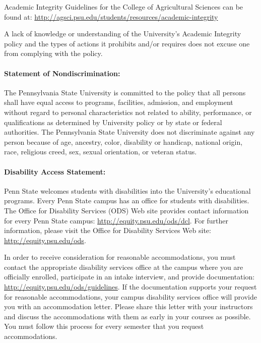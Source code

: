 \documentclass[11pt]{article}
\begin{document}
Academic Integrity Guidelines for the College of Agricultural Sciences can be found at: \url{http://agsci.psu.edu/students/resources/academic-integrity}

A lack of knowledge or understanding of the University's Academic Integrity policy and the types of actions it prohibits and/or requires does not excuse one from complying with the policy.

\paragraph{Statement of Nondiscrimination:} The Pennsylvania State University is committed to the policy that all persons shall have equal access to programs, facilities, admission, and employment without regard to personal characteristics not related to ability, performance, or qualifications as determined by University policy or by state or federal authorities. The Pennsylvania State University does not discriminate against any person because of age, ancestry, color, disability or handicap, national origin, race, religious creed, sex, sexual orientation, or veteran status.

\paragraph{Disability Access Statement:} Penn State welcomes students with disabilities into the University's educational programs. Every Penn State campus has an office for students with disabilities. The Office for Disability Services (ODS) Web site provides contact information for every Penn State campus: \url{http://equity.psu.edu/ods/dcl}. For further information, please visit the Office for Disability Services Web site: \url{http://equity.psu.edu/ods}. 

In order to receive consideration for reasonable accommodations, you must contact the appropriate disability services office at the campus where you are officially enrolled, participate in an intake interview, and provide documentation: \url{http://equity.psu.edu/ods/guidelines}. If the documentation supports your request for reasonable accommodations, your campus disability services office will provide you with an accommodation letter. Please share this letter with your instructors and discuss the accommodations with them as early in your courses as possible. You must follow this process for every semester that you request accommodations.
\clearpage
\end{document}
